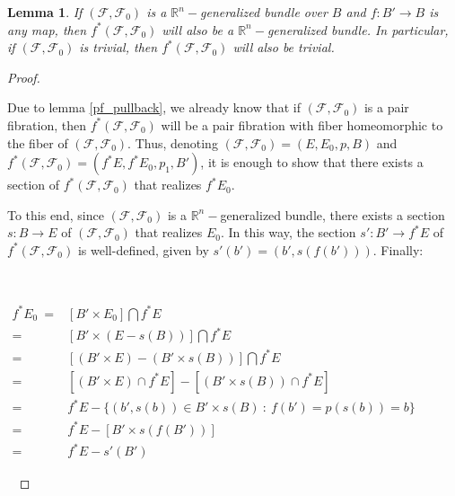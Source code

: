 \documentclass[12pt,oneside]{book}
\newtheorem{lem}    {Lemma}[chapter]
\newcommand{\R}{\mathbb{R}}
\begin{document}
    \begin{lem}\label{fht_pullback}
        If $(\mathcal{F},\mathcal{F}_{0})$ is a $\R^{n}-$generalized bundle over $B$ and $f:B'\to B$ is any 
        map, then $f^{*}(\mathcal{F},\mathcal{F}_{0})$ will also be a $\R^{n}-$generalized bundle. In particular, if 
        $(\mathcal{F},\mathcal{F}_{0})$ is trivial, then $f^{*}(\mathcal{F},\mathcal{F}_{0})$ will also be trivial.
    \end{lem}

    \begin{proof}

        \

        Due to lemma \ref{pf_pullback}, we already know that if $(\mathcal{F},\mathcal{F}_{0})$ is a pair fibration, then 
        $f^{*}(\mathcal{F},\mathcal{F}_{0})$ will be a pair fibration with fiber homeomorphic to the fiber of $(\mathcal{F},\mathcal{F}_{0})$. 
        Thus, denoting $(\mathcal{F},\mathcal{F}_{0})=(E,E_{0},p,B)$ and $f^{*}(\mathcal{F},\mathcal{F}_{0})=(f^{*}E,f^{*}E_{0},p_{1},B')$, 
        it is enough to show that there exists a section of $f^{*}(\mathcal{F},\mathcal{F}_{0})$ that realizes $f^{*}E_{0}$.
    
        To this end, since $(\mathcal{F},\mathcal{F}_{0})$ is a $\R^{n}-$generalized bundle, there exists a section $s:B\to E$ of 
        $(\mathcal{F},\mathcal{F}_{0})$ that realizes $E_{0}$. In this way, the section 
        $s':B'\to f^{*}E$ of $f^{*}(\mathcal{F},\mathcal{F}_{0})$ is well-defined, given by $s'(b')=(b',s(f(b')))$. Finally:

        \
        
        $\begin{array}{rl}
            f^{*}E_{0} \ = & [B'\times E_{0}]\bigcap f^{*}E \\
            = & [B'\times (E-s(B))]\bigcap f^{*}E \\
            = & [(B'\times E)-(B'\times s(B))]\bigcap f^{*}E \\
            = & [(B'\times E)\cap f^{*}E]-[(B'\times s(B))\cap f^{*}E] \\
            = & f^{*}E - \{ (b',s(b))\in B'\times s(B) \ : \ f(b')=p(s(b))=b \} \\
            = & f^{*}E - [B'\times s(f(B'))] \\
            = & f^{*}E - s'(B')
        \end{array}$
        
        \
    

\end{proof}
\end{document}
